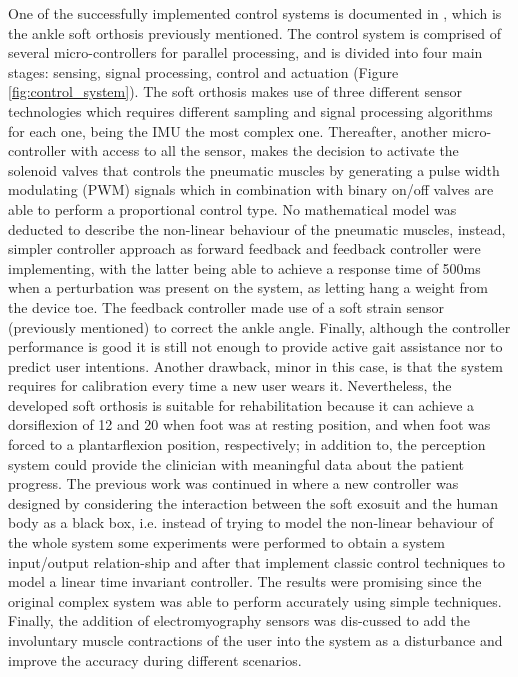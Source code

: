 One of the successfully implemented control systems is documented in \cite{park2011bio}, which is the ankle soft orthosis previously mentioned. The control system is comprised of several micro-controllers for parallel processing, and is divided into four main stages: sensing, signal processing, control and actuation (Figure \ref{fig:control_system}). The soft orthosis makes use of three different sensor technologies which requires different sampling and signal processing algorithms for each one, being the IMU the most complex one. Thereafter, another micro-controller with access to all the sensor, makes the decision to activate the solenoid valves that controls the pneumatic muscles by generating a pulse width modulating (PWM) signals which in combination with binary on/off valves are able to perform a proportional control type. No mathematical model was deducted to describe the non-linear behaviour of the pneumatic muscles, instead, simpler controller approach as forward feedback and feedback controller were implementing, with the latter being able to achieve a response time of 500ms when a perturbation was present on the system, as letting hang a weight from the device toe. The feedback controller made use of a soft strain sensor (previously mentioned) to correct the ankle angle. Finally, although the controller performance is good it is still not enough to provide active gait assistance nor to predict user intentions. Another drawback, minor in this case, is that the system requires for calibration every time a new user wears it. Nevertheless, the developed soft orthosis is suitable for rehabilitation because it can achieve a dorsiflexion of 12\textdegree{} and 20\textdegree{} when foot was at resting position, and when foot was forced to a plantarflexion position, respectively; in addition to, the perception system could provide the clinician with meaningful data about the patient progress. The previous work was continued in \cite{park2014design} where a new controller was designed by considering the interaction between the soft exosuit and the human body as a black box, i.e. instead of trying to model the non-linear behaviour of the whole system some experiments were performed to obtain a system input/output relation-ship and after that implement classic control techniques to model a linear time invariant controller. The results were promising since the original complex system was able to perform accurately using simple techniques. Finally, the addition of electromyography sensors was dis-cussed to add the involuntary muscle contractions of the user into the system as a disturbance and improve the accuracy during different scenarios.

